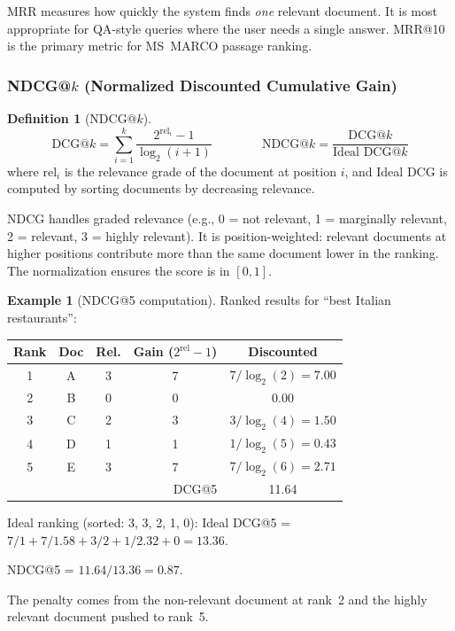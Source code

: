 \documentclass[11pt,a4paper]{article}
\theoremstyle{definition}
\newtheorem{definition}{Definition}[section]
\newtheorem{example}{Example}[section]
\theoremstyle{plain}
\begin{document}
MRR measures how quickly the system finds \emph{one} relevant document. It is most appropriate for QA-style queries where the user needs a single answer. MRR@10 is the primary metric for MS~MARCO passage ranking.

\subsubsection{NDCG@$k$ (Normalized Discounted Cumulative Gain)}

\begin{definition}[NDCG@$k$]
\begin{equation}
\text{DCG@}k = \sum_{i=1}^{k} \frac{2^{\text{rel}_i} - 1}{\log_2(i+1)} \qquad\qquad \text{NDCG@}k = \frac{\text{DCG@}k}{\text{Ideal DCG@}k}
\label{eq:ndcg}
\end{equation}
where $\text{rel}_i$ is the relevance grade of the document at position $i$, and Ideal DCG is computed by sorting documents by decreasing relevance.
\end{definition}

NDCG handles graded relevance (e.g., 0 = not relevant, 1 = marginally relevant, 2 = relevant, 3 = highly relevant). It is position-weighted: relevant documents at higher positions contribute more than the same document lower in the ranking. The normalization ensures the score is in $[0, 1]$.

\begin{example}[NDCG@5 computation]
\label{ex:ndcg}
Ranked results for ``best Italian restaurants'':
\begin{center}
\small
\begin{tabular}{ccccc}
\toprule
\textbf{Rank} & \textbf{Doc} & \textbf{Rel.} & \textbf{Gain ($2^\text{rel}-1$)} & \textbf{Discounted} \\
\midrule
1 & A & 3 & 7 & $7/\log_2(2) = 7.00$ \\
2 & B & 0 & 0 & $0.00$ \\
3 & C & 2 & 3 & $3/\log_2(4) = 1.50$ \\
4 & D & 1 & 1 & $1/\log_2(5) = 0.43$ \\
5 & E & 3 & 7 & $7/\log_2(6) = 2.71$ \\
\midrule
\multicolumn{4}{r}{DCG@5} & 11.64 \\
\bottomrule
\end{tabular}
\end{center}

Ideal ranking (sorted: 3, 3, 2, 1, 0): Ideal DCG@5 = $7/1 + 7/1.58 + 3/2 + 1/2.32 + 0 = 13.36$.

NDCG@5 = $11.64 / 13.36 = \mathbf{0.87}$.

The penalty comes from the non-relevant document at rank~2 and the highly relevant document pushed to rank~5.
\end{example}
\end{document}
